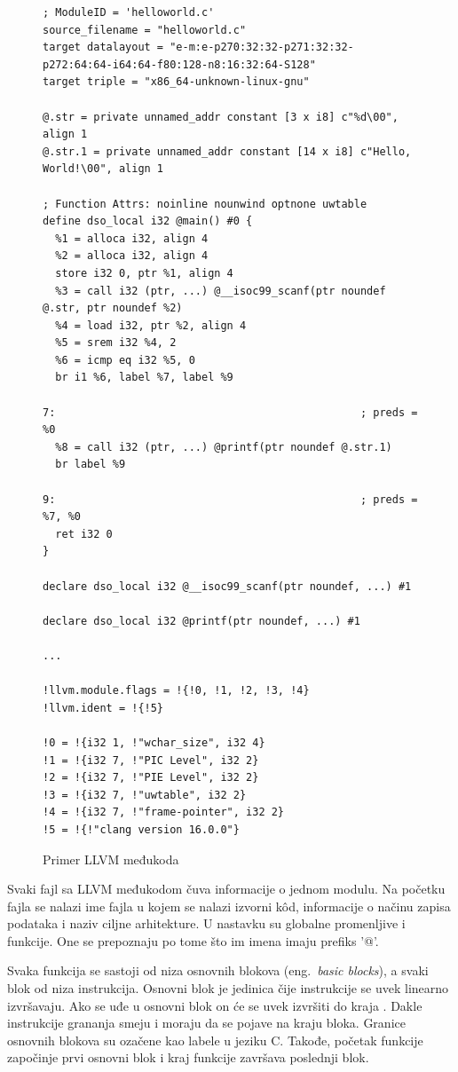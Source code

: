 \documentclass[12pt,oneside]{memoir}
\begin{document}
\begin{figure}[!ht]
\begin{verbatim}
; ModuleID = 'helloworld.c'
source_filename = "helloworld.c"
target datalayout = "e-m:e-p270:32:32-p271:32:32-p272:64:64-i64:64-f80:128-n8:16:32:64-S128"
target triple = "x86_64-unknown-linux-gnu"

@.str = private unnamed_addr constant [3 x i8] c"%d\00", align 1
@.str.1 = private unnamed_addr constant [14 x i8] c"Hello, World!\00", align 1

; Function Attrs: noinline nounwind optnone uwtable
define dso_local i32 @main() #0 {
  %1 = alloca i32, align 4
  %2 = alloca i32, align 4
  store i32 0, ptr %1, align 4
  %3 = call i32 (ptr, ...) @__isoc99_scanf(ptr noundef @.str, ptr noundef %2)
  %4 = load i32, ptr %2, align 4
  %5 = srem i32 %4, 2
  %6 = icmp eq i32 %5, 0
  br i1 %6, label %7, label %9

7:                                                ; preds = %0
  %8 = call i32 (ptr, ...) @printf(ptr noundef @.str.1)
  br label %9

9:                                                ; preds = %7, %0
  ret i32 0
}

declare dso_local i32 @__isoc99_scanf(ptr noundef, ...) #1

declare dso_local i32 @printf(ptr noundef, ...) #1

...

!llvm.module.flags = !{!0, !1, !2, !3, !4}
!llvm.ident = !{!5}

!0 = !{i32 1, !"wchar_size", i32 4}
!1 = !{i32 7, !"PIC Level", i32 2}
!2 = !{i32 7, !"PIE Level", i32 2}
!3 = !{i32 7, !"uwtable", i32 2}
!4 = !{i32 7, !"frame-pointer", i32 2}
!5 = !{!"clang version 16.0.0"}
\end{verbatim}
\caption{Primer LLVM međukoda}
\label{lst:llvm_ir_example}
\end{figure}

Svaki fajl sa LLVM međukodom čuva informacije o jednom modulu.
Na početku fajla se nalazi ime fajla u kojem se nalazi izvorni k\^od, informacije o načinu zapisa podataka i naziv ciljne arhitekture.
U nastavku su globalne promenljive i funkcije.
One se prepoznaju po tome što im imena imaju prefiks '@'.

Svaka funkcija se sastoji od niza osnovnih blokova (eng.~{\em basic blocks}), a svaki blok od niza instrukcija.
Osnovni blok je jedinica čije instrukcije se uvek linearno izvršavaju. Ako se uđe u osnovni blok on će se uvek izvršiti do kraja \cite{aho2006compilers}. 
Dakle instrukcije grananja smeju i moraju da se pojave na kraju bloka.
Granice osnovnih blokova su ozačene kao labele u jeziku C.
Takođe, početak funkcije započinje prvi osnovni blok i kraj funkcije završava poslednji blok.
\end{document}
